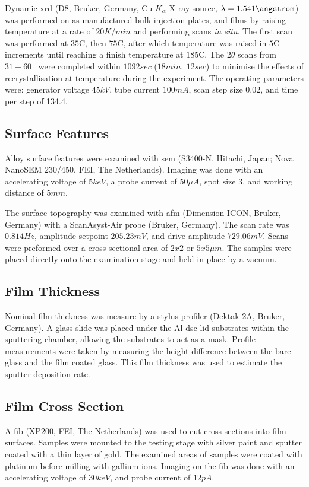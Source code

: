 Dynamic \acrshort{xrd} (D8, Bruker, Germany, Cu $K_{\alpha}$ X-ray source, $\lambda = 1.541 \angstrom$) was performed on as manufactured bulk injection plates, and films by raising temperature at a rate of $20 K/min$ and performing scans \textit{in situ}. The first scan was performed at $35$\degree C, then $75$\degree C, after which temperature was raised in $5$\degree C increments until reaching a finish temperature at $185$\degree C. The $2 \theta$ scans from $31 - 60$\degree~ were completed within $1092 sec$ ($18min,~ 12sec$) to minimise the effects of recrystallisation at temperature during the experiment.
The operating parameters were: generator voltage $45 kV$, tube current $100 mA$, scan step size 0.02, and time per step of 134.4. 

\subsection{Surface Features}
Alloy surface features were examined with \gls{sem} (S3400-N, Hitachi, Japan; Nova NanoSEM 230/450, FEI, The Netherlands). Imaging was done with an accelerating voltage of $5keV$, a probe current of $50 \mu A$, spot size 3, and working distance of $5mm$.

The surface topography was examined with \gls{afm} (Dimension ICON, Bruker, Germany) with a ScanAsyst-Air probe (Bruker, Germany). The scan rate was $0.814 Hz$, amplitude setpoint $205.23 mV$, and drive amplitude $729.06 mV$. Scans were preformed over a cross sectional area of $2x2$ or $5x5 \mu m$. The samples were placed directly onto the examination stage and held in place by a vacuum. 

\subsection{Film Thickness}
Nominal film thickness was measure by a stylus profiler (Dektak 2A, Bruker, Germany). A glass slide was placed under the Al \gls{dsc} lid substrates within the sputtering chamber, allowing the substrates to act as a mask. Profile measurements were taken by measuring the height difference between the bare glass and the film coated glass. This film thickness was used to estimate the sputter deposition rate.  

\subsection{Film Cross Section}
A \gls{fib} (XP200, FEI, The Netherlands) was used to cut cross sections into film surfaces. Samples were mounted to the testing stage with silver paint and sputter coated with a thin layer of gold. The examined areas of samples were coated with platinum before milling with gallium ions. Imaging on the \gls{fib} was done with an accelerating voltage of $30keV$, and probe current of $12 pA$.

